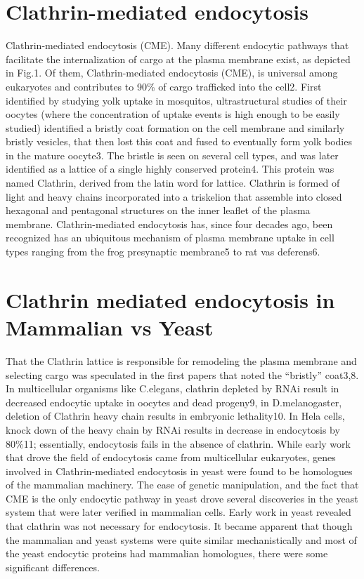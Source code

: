 	\section{Clathrin-mediated endocytosis}
	Clathrin-mediated endocytosis (CME).
Many different endocytic pathways that facilitate the internalization of cargo at the plasma membrane exist, as depicted in Fig.1. Of them, Clathrin-mediated endocytosis (CME), is universal among eukaryotes and contributes to 90\% of cargo trafficked into the cell2. First identified by studying yolk uptake in mosquitos, ultrastructural studies of their oocytes (where the concentration of uptake events is high enough to be easily studied) identified a bristly coat formation on the cell membrane and similarly bristly vesicles, that then lost this coat and fused to eventually form yolk bodies in the mature oocyte3. The bristle is seen on several cell types, and was later identified as a lattice of a single highly conserved protein4. This protein was named Clathrin, derived from the latin word for lattice. Clathrin is formed of light and heavy chains incorporated into a triskelion that assemble into closed hexagonal and pentagonal structures on the inner leaflet of the plasma membrane. Clathrin-mediated endocytosis has, since four decades ago, been recognized has an ubiquitous mechanism of plasma membrane uptake in cell types ranging from the frog presynaptic membrane5 to rat vas deferens6. 

	
	\section{Clathrin mediated endocytosis in Mammalian vs Yeast}
That the Clathrin lattice is responsible for remodeling the plasma membrane and selecting cargo was speculated in the first papers that noted the “bristly” coat3,8.  In multicellular organisms like C.elegans, clathrin depleted by RNAi result in decreased endocytic uptake in oocytes and dead progeny9, in D.melanogaster, deletion of Clathrin heavy chain results in embryonic lethality10. In Hela cells, knock down of the heavy chain by RNAi results in decrease in endocytosis by 80\%11; essentially, endocytosis fails in the absence of clathrin. While early work that drove the field of endocytosis came from multicellular eukaryotes, genes involved in Clathrin-mediated endocytosis in yeast were found to be homologues of the mammalian machinery. The ease of genetic manipulation, and the fact that CME is the only endocytic pathway in yeast drove several discoveries in the yeast system that were later verified in mammalian cells.  Early work in yeast revealed that clathrin was not necessary for endocytosis. It became apparent that though the mammalian and yeast systems were quite similar mechanistically and most of the yeast endocytic proteins had mammalian homologues, there were some significant differences. 

